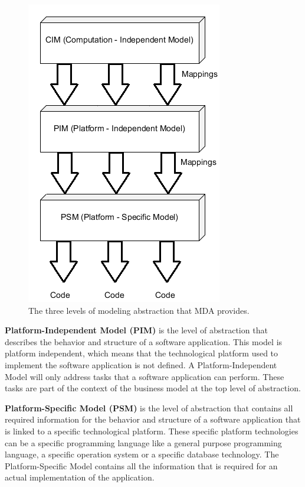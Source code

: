 \begin{figure}[H]
	\centering
	\includegraphics[scale=0.7]{./Figures/MDA_Platforms.png}
	\caption[The three levels of modeling abstraction for MDA]
	{The three levels of modeling abstraction that MDA provides.}
	\label{fig:MDA_PLATFORM}
\end{figure}

\textbf{Platform-Independent Model (PIM)} is the level of abstraction that
describes the behavior and structure of a software application. This model is
platform independent, which means that the technological platform used to
implement the software application is not defined. A Platform-Independent Model
will only address tasks that a software application can perform. These tasks
are part of the context of the business model at the top level of abstraction.

\textbf{Platform-Specific Model (PSM)} is the level of abstraction that contains
all required information for the behavior and structure of a software
application that is linked to a specific technological platform. These specific
platform technologies can be a specific programming language like a general
purpose programming language, a specific operation system or a specific database
technology. The Platform-Specific Model contains all the information that is
required for an actual implementation of the application. 

